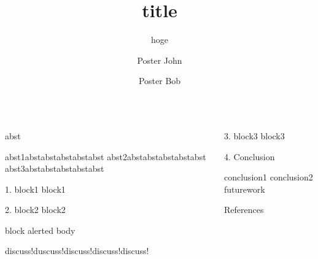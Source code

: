 \documentclass[final,14pt]{beamer}
\title{title}
\subtitle{hoge}
\author{Poster John \inst{1} \and Poster Bob \inst{1}}
\institute[shortinst]{\inst{1} Poster Univ.}
\begin{document}
\begin{frame}[t]
\begin{columns}[t]
\separatorcolumn


\begin{column}{\colwidth}

  \begin{alertblock}{abst}
    \begin{itemize}
      \okitem abst1abstabstabstabstabst
      \okitem abst2abstabstabstabstabst
      \okitem abst3abstabstabstabstabst
    \end{itemize}
  \end{alertblock}


  \begin{block}{1. block1}
    block1
  \end{block}
  \begin{block}{2. block2}
    block2\\
      \vspace{1em}
      \begin{beamercolorbox}[colsep*=0.5em]{block alerted body}
       \vspace{-0.5em}
       \begin{itemize}
           \exitem discuss!duscuss!discuss!discuss!discuss!
       \end{itemize}
      \end{beamercolorbox}
  \end{block}

\end{column}

\separatorcolumn

\begin{column}{\colwidth}

  \begin{block}{3. block3} 
    block3
  \end{block}

  \begin{block}{4. Conclusion}
      \begin{itemize}
          \okitem conclusion1
          \okitem conclusion2
          \exitem futurework
      \end{itemize}
  \end{block}
 
  \vspace{-1em}

  \begin{block}{References}

    \nocite{*}
    \footnotesize{}

  \end{block}

\end{column}
\separatorcolumn



\end{columns}
\end{frame}
\end{document}
